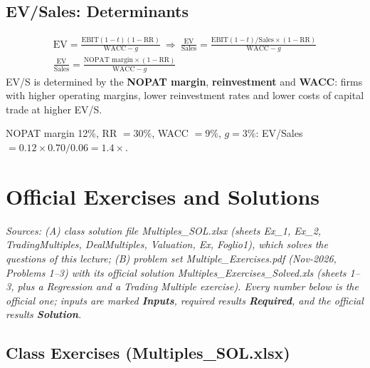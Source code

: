 \subsection{EV/Sales: Determinants}
\begin{keybox}
\begin{gather*}
\text{EV}=\frac{\text{EBIT}(1-t)(1-\text{RR})}{\text{WACC}-g}\ \Rightarrow\ \frac{\text{EV}}{\text{Sales}}=\frac{\text{EBIT}(1-t)/\text{Sales}\times(1-\text{RR})}{\text{WACC}-g}\\
\frac{\text{EV}}{\text{Sales}}=\frac{\text{NOPAT margin}\times(1-\text{RR})}{\text{WACC}-g}
\end{gather*}
EV/S is determined by the \textbf{NOPAT margin}, \textbf{reinvestment} and \textbf{WACC}: firms with higher operating margins, lower reinvestment rates and lower costs of capital trade at higher EV/S.
\end{keybox}
\begin{exbox}
NOPAT margin 12\%, RR $=30\%$, WACC $=9\%$, $g=3\%$: EV/Sales $=0.12\times0.70/0.06=\mathbf{1.4\times}$.
\end{exbox}

\section{Official Exercises and Solutions}\label{sec:mult-official}

{\sloppy \emph{Sources: (A) class solution file \textit{Multiples\_SOL.xlsx} (sheets Ex\_1, Ex\_2, Trading\-Multiples, Deal\-Multiples, Valuation, Ex, Foglio1), which solves the questions of this lecture; (B) problem set \textit{Multiple\_Exercises.pdf} (Nov-2026, Problems 1--3) with its official solution \textit{Multiples\_Exercises\_Solved.xls} (sheets 1--3, plus a Regression and a Trading Multiple exercise). Every number below is the official one; inputs are marked \textbf{Inputs}, required results \textbf{Required}, and the official results \textbf{Solution}.}\par}

\subsection{Class Exercises (Multiples\_SOL.xlsx)}

